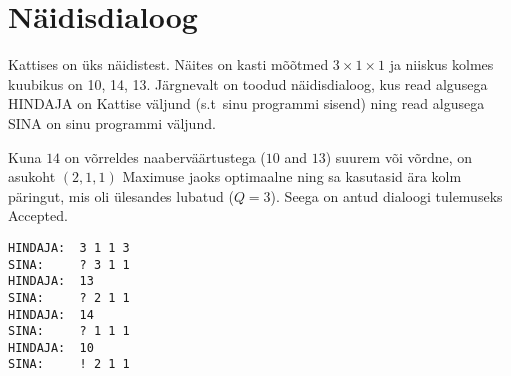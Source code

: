\section*{Näidisdialoog}
Kattises on üks näidistest. Näites on kasti mõõtmed $3\times 1\times 1$ ja niiskus kolmes kuubikus on {10, 14, 13}. 
Järgnevalt on toodud näidisdialoog, kus read algusega HINDAJA on Kattise väljund (s.t\ sinu programmi sisend) ning read algusega SINA on sinu programmi väljund.

Kuna $14$ on võrreldes naaberväärtustega ($10$ and $13$) suurem või võrdne, on asukoht $(2,1,1)$ Maximuse jaoks optimaalne ning sa kasutasid ära kolm päringut, 
mis oli ülesandes lubatud ($Q=3$). Seega on antud dialoogi tulemuseks Accepted.

\begin{verbatim}
HINDAJA:  3 1 1 3
SINA:     ? 3 1 1
HINDAJA:  13
SINA:     ? 2 1 1
HINDAJA:  14
SINA:     ? 1 1 1
HINDAJA:  10
SINA:     ! 2 1 1
\end{verbatim}
